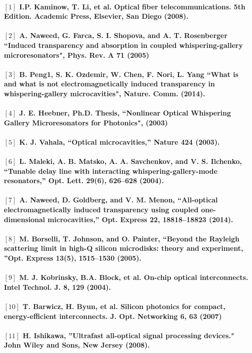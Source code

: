 \paragraph{\normalfont \large $[1]$ I.P. Kaminow, T. Li, et al. Optical fiber telecommunications. 5th Edition. Academic Press, Elsevier, San Diego (2008). \\ 
\\$[2]$ A. Naweed, G. Farca, S. I. Shopova, and A. T. Rosenberger “Induced transparency and absorption in coupled whispering-gallery microresonators", Phys. Rev. A \textbf{71} (2005)\\
\\$[3]$ B. Peng1, S. K. Ozdemir, W. Chen, F. Nori, L. Yang “What is and what is not electromagnetically induced transparency in whispering-gallery microcavities", Nature. Comm. (2014). \\
\\$[4]$ J. E. Heebner, Ph.D. Thesis, “Nonlinear Optical Whispering Gallery Microresonators for Photonics", (2003)  \\
\\$[5]$ K. J. Vahala, “Optical microcavities,” Nature \textbf{424} (2003).\\
\\$[6]$ L. Maleki, A. B. Matsko, A. A. Savchenkov, and V. S. Ilchenko, “Tunable delay line with interacting
whispering-gallery-mode resonators,” Opt. Lett. 29(6), 626–628 (2004).\\
\\$[7]$ A. Naweed, D. Goldberg, and V. M. Menon, “All-optical electromagnetically induced transparency using
coupled one-dimensional microcavities,” Opt. Express 22, 18818–18823 (2014).\\
\\$[8]$ M. Borselli, T. Johnson, and O. Painter, “Beyond the Rayleigh scattering limit in high-Q silicon microdisks:
theory and experiment, ”Opt. Express 13(5), 1515–1530 (2005).\\
\\$[9]$ M. J. Kobrinsky, B.A. Block, et al. On-chip optical interconnects. Intel Technol. J. \textbf{8}, 129 (2004).\\
\\$[10]$ T. Barwicz, H. Byun, et al. Silicon photonics for compact, energy-efficient interconnects. J. Opt. Networking \textbf{6}, 63 (2007)\\
\\$[11]$ H. Ishikawa, ”Ultrafast all-optical signal processing devices." John Wiley and Sons, New Jersey (2008). \\
}

